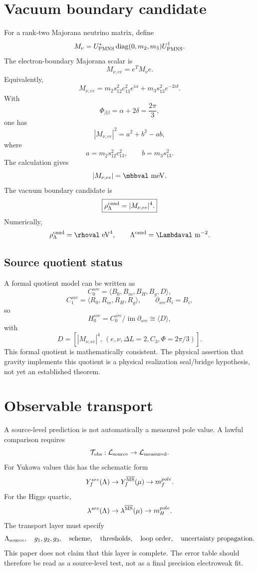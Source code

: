 \documentclass[11pt]{article}
\newcommand{\status}[1]{\textsf{#1}}
\newcommand{\seal}{\status{physical realization seal}}
\newcommand{\bridge}{\status{bridge hypothesis}}
\newcommand{\diag}{\operatorname{diag}}
\begin{document}
\section{Vacuum boundary candidate}

For a rank-two Majorana neutrino matrix, define
\[
M_\nu=U_{\rm PMNS}^*
\diag(0,m_2,m_3)
U_{\rm PMNS}^{\dagger}.
\]
The electron-boundary Majorana scalar is
\[
M_{\nu,ee}=e^TM_\nu e.
\]
Equivalently,
\[
M_{\nu,ee}
=
m_2s_{12}^2c_{13}^2e^{i\alpha}
+
m_3s_{13}^2e^{-2i\delta}.
\]
With
\[
\Phi_{\beta\beta}=\alpha+2\delta=\frac{2\pi}{3},
\]
one has
\[
|M_{\nu,ee}|^2=a^2+b^2-ab,
\]
where
\[
a=m_2s_{12}^2c_{13}^2,\qquad b=m_3s_{13}^2.
\]
The calculation gives
\[
|M_{\nu,ee}|=\mbbval\ {\rm meV}.
\]
The vacuum boundary candidate is
\[
\boxed{
\rho_\Lambda^{\rm cand}=|M_{\nu,ee}|^4.
}
\]
Numerically,
\[
\rho_\Lambda^{\rm cand}=\rhoval\ {\rm eV}^4,\qquad
\Lambda^{\rm cand}=\Lambdaval\ {\rm m}^{-2}.
\]

\subsection{Source quotient status}

A formal quotient model can be written as
\[
C_0^{src}=\langle B_0,B_m,B_H,B_g,D\rangle,
\]
\[
C_1^{src}=\langle R_0,R_m,R_H,R_g\rangle,\qquad
\partial_{src}R_i=B_i,
\]
so
\[
H_0^{src}
=
C_0^{src}/\operatorname{im}\partial_{src}
\cong
\langle D\rangle,
\]
with
\[
D=
\left[
|M_{\nu,ee}|^4,\,
(e,\nu,\Delta L=2,C_3,\Phi=2\pi/3)
\right].
\]
This formal quotient is mathematically consistent. The physical assertion that gravity implements this quotient is a \seal/\bridge, not yet an established theorem.

\section{Observable transport}

A source-level prediction is not automatically a measured pole value. A lawful comparison requires
\[
\mathcal T_{\rm obs}:
\mathcal L_{\rm source}\to\mathcal L_{\rm measured}.
\]
For Yukawa values this has the schematic form
\[
Y_f^{src}(\Lambda)
\to
Y_f^{\overline{\rm MS}}(\mu)
\to
m_f^{pole}.
\]
For the Higgs quartic,
\[
\lambda^{src}(\Lambda)
\to
\lambda^{\overline{\rm MS}}(\mu)
\to
m_H^{pole}.
\]
The transport layer must specify
\[
\Lambda_{\rm source},\quad g_1,g_2,g_3,\quad
\text{scheme},\quad
\text{thresholds},\quad
\text{loop order},\quad
\text{uncertainty propagation}.
\]
This paper does not claim that this layer is complete. The error table should therefore be read as a source-level test, not as a final precision electroweak fit.
\end{document}
